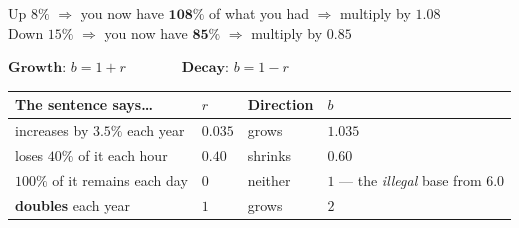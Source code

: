 \documentclass[aspectratio=169, 11pt]{beamer}
\begin{document}
\begin{frame}[t, plain]
  \begin{center}
    Up $8\%$ $\Rightarrow$ you now have $\mathbf{108\%}$ of what you had $\Rightarrow$ multiply by
    $\mathbf{1.08}$ \\[3pt]
    Down $15\%$ $\Rightarrow$ you now have $\mathbf{85\%}$ $\Rightarrow$ multiply by $\mathbf{0.85}$
  \end{center}
  \vspace{4pt}
  \begin{center}
    \Large $\textbf{Growth: } b = 1+r \qquad\qquad \textbf{Decay: } b = 1-r$
  \end{center}
  \vspace{6pt}
  \begin{center}
  \footnotesize
  \renewcommand{\arraystretch}{1.3}
  \begin{tabular}{llll}
  \hline
  \textbf{The sentence says\dots} & \textbf{$r$} & \textbf{Direction} & \textbf{$b$} \\
  \hline
  increases by $3.5\%$ each year & $0.035$ & grows & $1.035$ \\
  loses $40\%$ of it each hour & $0.40$ & shrinks & $0.60$ \\
  $100\%$ of it remains each day & $0$ & neither & $1$ --- the \emph{illegal} base from 6.0 \\
  \textbf{doubles} each year & $1$ & grows & $2$ \\
  \hline
  \end{tabular}
  \end{center}
\end{frame}
\end{document}
